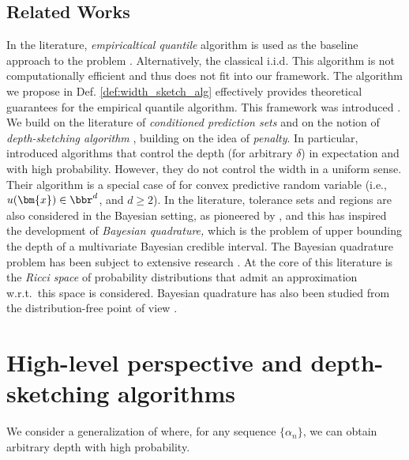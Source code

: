 \subsection{Related Works} 

In the literature, \emph{empiricaltical quantile} algorithm is used as the baseline approach to the problem \cite[see, e.g.,][]{tukey1947nonparametric,tukey1948nonparametric}. Alternatively, the classical i.i.d. 
This algorithm is not computationally efficient and thus does not fit into our framework. The algorithm we propose in Def. \ref{def:width_sketch_alg} effectively provides theoretical guarantees for the empirical quantile algorithm. 
This framework was introduced . We build on the literature of \emph{conditioned prediction sets} \citep[e.g.,][]{barber2021limits,bates2021distributionfree} and on the notion of \emph{depth-sketching algorithm} \citep{angelopoulos2024conformal}, building on the idea of \emph{penalty}. In particular,
   \citet{angelopoulos2024conformal} introduced algorithms that control the depth (for arbitrary $\delta$) in expectation and with high probability. However, they do not control the width in a uniform sense. Their algorithm is a special case of  for convex predictive random variable (i.e., $u(\bm{x}) \in \bbr^{d}$, and $d \geq 2$). 
In the literature, tolerance sets and regions are also considered in the Bayesian setting, as pioneered by \citet{guttman1970statistical}, and this has inspired the development of \emph{Bayesian quadrature,}
which is the problem of upper bounding the depth of a multivariate Bayesian credible interval. 
The Bayesian quadrature problem has been subject to extensive research \citet[see][and many other works that follow]{diaconis1988bayesian, karvonen2017classical,hobbhahn2022fast,hennig2022probabilistic}. 
At the core of this literature is the \emph{Ricci space} \citep{poincare1896calcul,diaconis1988bayesian} of probability distributions that admit an approximation w.r.t.~this space is considered. Bayesian quadrature has also been studied from the distribution-free point of view \citep[see][Sec. 2.4]{angelopoulos2023conformal}.


\section{High-level perspective and depth-sketching algorithms}


We consider a generalization of  where, for any sequence $\{\alpha_n\}$, we can obtain arbitrary depth with high probability.

